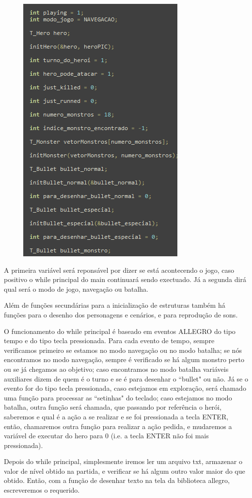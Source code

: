 \documentclass[a4paper, 12pt]{article}
\begin{document}
\begin{figure}[H]
\centering
\includegraphics[scale=0.5]{variaveis_main.png}
\label{label4}
\end{figure}


  A primeira variável será reponsável por dizer se está acontecendo o jogo, caso positivo o while principal do main continuará sendo exectuado.  Já a segunda dirá qual será o modo de jogo, navegação ou batalha.
  
  Além de funções secundárias para a inicialização de estruturas também há funções para o desenho dos personagens e cenários, e para reprodução de sons.
  
  O funcionamento do while principal é baseado em eventos ALLEGRO do tipo tempo e do tipo tecla pressionada. Para cada evento de tempo, sempre verificamos primeiro se estamos no modo navegação ou no modo batalha; se nós encontramos no modo navegação, sempre é verificado se há algum monstro perto ou se já chegamos ao objetivo; caso encontramos no modo batalha variáveis auxiliares dizem de quem é o turno e se é para desenhar o ``bullet" ou não. Já se o evento for do tipo tecla pressionada, caso estejamos em exploração, será chamado uma função para processar as ``setinhas" do teclado; caso estejamos no modo batalha, outra função será chamada, que passando por referência o herói,  saberemos e qual é a ação a se realizar e se foi pressionada a tecla ENTER, então, chamaremos outra função para realizar a ação pedida, e mudaremos a variável de executar do hero para 0 (i.e. a tecla ENTER não foi mais pressionada).
  
  Depois do while principal, simplesmente iremos ler um arquivo txt, armazenar o valor de nível obtido na partida, e verificar se há algum outro valor maior do que obtido. Então, com a função de desenhar texto na tela da biblioteca allegro, escreveremos o requerido.
  
\end{document}
